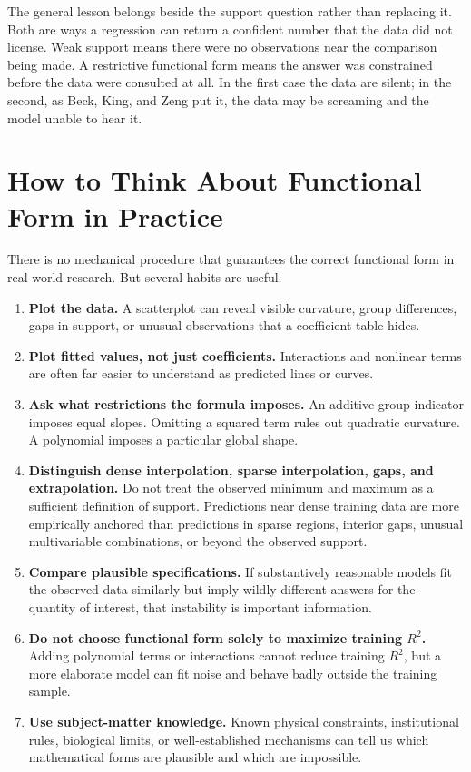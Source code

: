\documentclass[11pt]{report}
\begin{document}
The general lesson belongs beside the support question rather than replacing it. Both are ways a regression can return a confident number that the data did not license. Weak support means there were no observations near the comparison being made. A restrictive functional form means the answer was constrained before the data were consulted at all. In the first case the data are silent; in the second, as Beck, King, and Zeng put it, the data may be screaming and the model unable to hear it.


\section{How to Think About Functional Form in Practice}

There is no mechanical procedure that guarantees the correct functional form in real-world research. But several habits are useful.

\begin{enumerate}
    \item \textbf{Plot the data.} A scatterplot can reveal visible curvature, group differences, gaps in support, or unusual observations that a coefficient table hides.

    \item \textbf{Plot fitted values, not just coefficients.} Interactions and nonlinear terms are often far easier to understand as predicted lines or curves.

    \item \textbf{Ask what restrictions the formula imposes.} An additive group indicator imposes equal slopes. Omitting a squared term rules out quadratic curvature. A polynomial imposes a particular global shape.

    \item \textbf{Distinguish dense interpolation, sparse interpolation, gaps, and extrapolation.} Do not treat the observed minimum and maximum as a sufficient definition of support. Predictions near dense training data are more empirically anchored than predictions in sparse regions, interior gaps, unusual multivariable combinations, or beyond the observed support.

    \item \textbf{Compare plausible specifications.} If substantively reasonable models fit the observed data similarly but imply wildly different answers for the quantity of interest, that instability is important information.

    \item \textbf{Do not choose functional form solely to maximize training \(R^2\).} Adding polynomial terms or interactions cannot reduce training \(R^2\), but a more elaborate model can fit noise and behave badly outside the training sample.

    \item \textbf{Use subject-matter knowledge.} Known physical constraints, institutional rules, biological limits, or well-established mechanisms can tell us which mathematical forms are plausible and which are impossible.
\end{enumerate}
\end{document}
